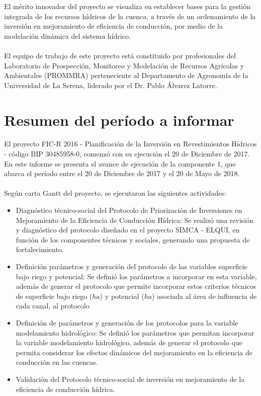 \documentclass[]{article}
\begin{document}
El mérito innovador del proyecto se visualiza en establecer bases para la gestión integrada de los recursos hídricos de la cuenca, a través de un ordenamiento de la inversión en mejoramiento de eficiencia de conducción, por medio de la modelación dinámica del sistema hídrico.\\
\\
El equipo de trabajo de este proyecto está constituido por profesionales del Laboratorio de Prospección, Monitoreo y Modelación de Recursos Agrícolas y Ambientales (PROMMRA) perteneciente al Departamento de Agronomía de la Universidad de La Serena, liderado por el Dr. Pablo Álvarez Latorre.\\
\clearpage

\section{Resumen del período a informar}

El proyecto FIC-R 2016 - Planificación de la Inversión en Revestimientos Hídricos - código BIP 30485958-0, comenzó con su ejecución el 20 de Diciembre de 2017. En este informe se presenta el avance de ejecución de la componente 1, que abarca el período entre el 20 de Diciembre de 2017 y el 20 de Mayo de 2018.\\
\\
Según carta Gantt del proyecto, se ejecutaron las siguientes actividades:
\begin{itemize}
\item Diagnóstico técnico-social del Protocolo de Priorización de Inversiones en Mejoramiento de la Eficiencia de Conducción Hídrica: Se realizó una revisión y diagnóstico del protocolo diseñado en el proyecto SIMCA - ELQUI, en función de los componentes técnicos y sociales, generando una propuesta de fortalecimiento.
\item Definición parámetros y generación del protocolo de las variables superficie bajo riego y potencial: Se definió los parámetros a incorporar en esta variable, además de generar el protocolo que permite incorporar estos criterios técnicos de superficie bajo riego ($ha$) y potencial ($ha$) asociada al área de influencia de cada canal, al protocolo 
\item Definición de parámetros y generación de los protocolos para la variable modelamiento hidrológico: Se definió los parámetros que permitan incorporar la variable modelamiento hidrológico, además de generar el protocolo que permita considerar los efectos dinámicos del mejoramiento en la eficiencia de conducción en las cuencas.
\item Validación del Protocolo técnico-social de inversión en mejoramiento de la eficiencia de conducción hídrica.
\end{itemize}
\end{document}
